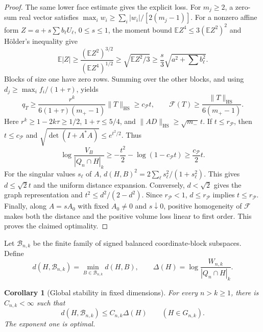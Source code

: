 \documentclass[11pt,a4paper]{article}
\newtheorem{corollary}[theorem]{Corollary}
\theoremstyle{remark}\newtheorem{remark}[theorem]{Remark}
\numberwithin{equation}{section}
\begin{document}
\begin{proof}
The same lower face estimate gives the explicit loss. For \(m_j\ge2\),
a zero-sum real vector satisfies
\(\max_i w_i\ge\sum_i|w_i|/[2(m_j-1)]\).
For a nonzero affine form \(Z=a+s\sum b_\ell U_\ell\), \(0\le s\le1\),
the moment bound \(\mathbb EZ^4\le3(\mathbb EZ^2)^2\) and H\"older's
inequality give
\[
 \mathbb E|Z|\ge
 \frac{(\mathbb EZ^2)^{3/2}}{(\mathbb EZ^4)^{1/2}}
 \ge\sqrt{\mathbb EZ^2/3}\ge\frac{s}{3}\sqrt{a^2+\sum b_\ell^2}.
\]
Blocks of size one have zero rows. Summing over the other blocks,
and using \(d_j\ge\max_i f_i/(1+\tau)\), yields
\[
 q_T\ge\frac{r^k}{6(1+\tau)(m_+-1)}\|T\|_{\mathrm{HS}}
       \ge c_{\mathcal P}t,\qquad
 \mathcal F(T)\ge\frac{\|T\|_{\mathrm{HS}}}{6(m_+-1)}.
\]
Here \(r^k\ge1-2k\tau\ge1/2\), \(1+\tau\le5/4\), and
\(\|AD\|_{\mathrm{HS}}\ge\sqrt{m_-}\,t\).
If \(t\le r_{\mathcal P}\), then \(t\le c_{\mathcal P}\) and
\(\sqrt{\det(I+A^*A)}\le e^{t^2/2}\). Thus
\[
 \log\frac{V_B}{|Q_n\cap H|_k}
 \ge-\frac{t^2}{2}-\log(1-c_{\mathcal P}t)
 \ge\frac{c_{\mathcal P}}2t.
\]
For the singular values \(s_\ell\) of \(A\),
\(d(H,B)^2=2\sum_\ell s_\ell^2/(1+s_\ell^2)\).
This gives \(d\le\sqrt2t\) and the uniform distance expansion.
Conversely, \(d<\sqrt2\) gives the graph representation and
\(t^2\le d^2/(2-d^2)\). Since \(r_{\mathcal P}<1\),
\(d\le r_{\mathcal P}\) implies \(t\le r_{\mathcal P}\).
Finally, along \(A=sA_0\) with fixed \(A_0\ne0\) and \(s\downarrow0\),
positive homogeneity of \(\mathcal F\) makes both the distance and
the positive volume loss linear to first order. This proves the claimed optimality.
\end{proof}

Let $\mathcal B_{n,k}$ be the finite family of signed balanced
coordinate-block subspaces. Define
\[
 d(H,\mathcal B_{n,k})=\min_{B\in\mathcal B_{n,k}}d(H,B),\qquad
 \Delta(H)=\log\frac{W_{n,k}}{|Q_n\cap H|_k}.
\]

\begin{corollary}[Global stability in fixed dimensions]
\label{cor:global-linear}
For every $n>k\ge1$, there is $C_{n,k}<\infty$ such that
\[
 d(H,\mathcal B_{n,k})\le C_{n,k}\Delta(H)
 \qquad(H\in G_{n,k}).
\]
The exponent one is optimal.
\end{corollary}
\end{document}

